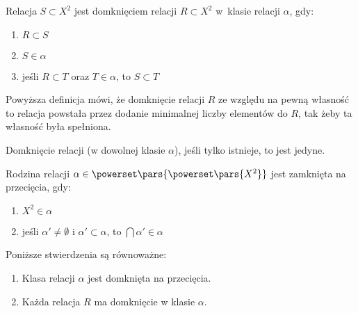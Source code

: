 \begin{definition}
    Relacja \( S \subset X^2 \) jest domknięciem relacji \( R \subset X^2 \) w~klasie relacji \( \alpha \), gdy:
    \begin{enumerate}
        \item \( R \subset S \)
        \item \( S \in \alpha \)
        \item jeśli \( R \subset T \) oraz \( T \in \alpha \), to \( S \subset T \)
    \end{enumerate}
\end{definition}
Powyższa definicja mówi, że domknięcie relacji \( R \) ze względu na pewną własność to relacja powstała przez dodanie minimalnej
liczby elementów do \( R \), tak żeby ta własność była spełniona.

Domknięcie relacji (w dowolnej klasie \( \alpha \)), jeśli tylko istnieje, to jest jedyne.

\begin{definition}
    Rodzina relacji \( \alpha \in \powerset\pars{\powerset\pars{X^2}} \) jest zamknięta na przecięcia, gdy:
    \begin{enumerate}
        \item \( X^2 \in \alpha \)
        \item jeśli \( \alpha' \neq \emptyset \) i \( \alpha' \subset \alpha \), to \( \bigcap \alpha' \in \alpha \)
    \end{enumerate}
\end{definition}

Poniższe stwierdzenia są równoważne:
\begin{enumerate}
    \item Klasa relacji \( \alpha \) jest domknięta na przecięcia.
    \item Każda relacja \( R \) ma domknięcie w klasie \( \alpha \).
\end{enumerate}